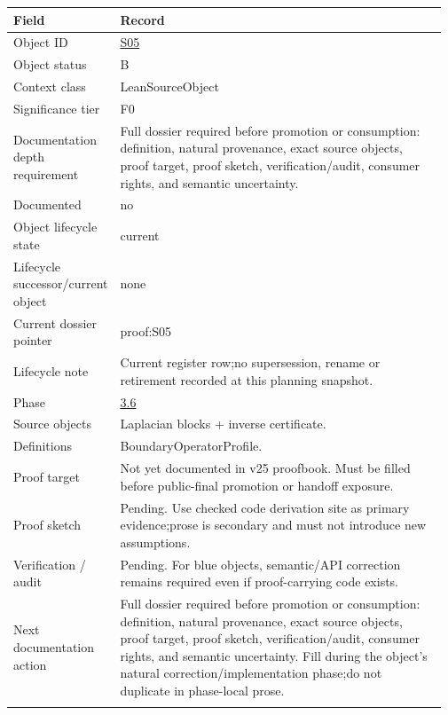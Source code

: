 \begin{longtable}{L{0.16\linewidth} L{0.81\linewidth}}
\hline
\textbf{Field} & \textbf{Record}\\
\hline
Object ID & \hyperlink{object-row-S05}{S05}\\
\hline\addlinespace[0.20em]
Object status & B\\
\hline\addlinespace[0.20em]
Context class & LeanSourceObject\\
\hline\addlinespace[0.20em]
Significance tier & F0\\
\hline\addlinespace[0.20em]
Documentation depth requirement & Full dossier required before promotion or consumption: definition, natural provenance, exact source objects, proof target, proof sketch, verification/\allowbreak{}audit, consumer rights, and semantic uncertainty.\\
\hline\addlinespace[0.20em]
Documented & no\\
\hline\addlinespace[0.20em]
Object lifecycle state & current\\
\hline\addlinespace[0.20em]
Lifecycle successor/\allowbreak{}current object & none\\
\hline\addlinespace[0.20em]
Current dossier pointer & proof:S05\\
\hline\addlinespace[0.20em]
Lifecycle note & Current register row;\newline no supersession, rename or retirement recorded at this planning snapshot.\\
\hline\addlinespace[0.20em]
Phase & \hyperlink{phase-row-3-6}{3.6}\\
\hline\addlinespace[0.20em]
Source objects & Laplacian blocks + inverse certificate.\\
\hline\addlinespace[0.20em]
Definitions & BoundaryOperatorProfile.\\
\hline\addlinespace[0.20em]
Proof target & Not yet documented in v25 proofbook. Must be filled before public-final promotion or handoff exposure.\\
\hline\addlinespace[0.20em]
Proof sketch & Pending. Use checked code derivation site as primary evidence;\newline prose is secondary and must not introduce new assumptions.\\
\hline\addlinespace[0.20em]
Verification /\allowbreak{} audit & Pending. For blue objects, semantic/\allowbreak{}API correction remains required even if proof-carrying code exists.\\
\hline\addlinespace[0.20em]
Next documentation action & Full dossier required before promotion or consumption: definition, natural provenance, exact source objects, proof target, proof sketch, verification/\allowbreak{}audit, consumer rights, and semantic uncertainty. Fill during the object's natural correction/\allowbreak{}implementation phase;\newline do not duplicate in phase-local prose.\\
\hline\addlinespace[0.20em]
\end{longtable}
